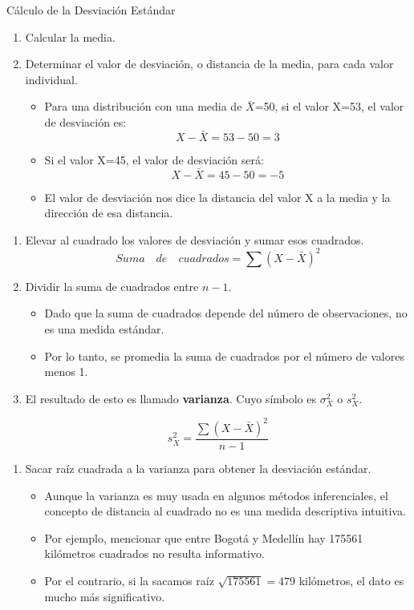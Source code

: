 \documentclass[xcolor=dvipsnames]{beamer}
\newcounter{saveenumi}
\newcommand{\seti}{\setcounter{saveenumi}{\value{enumi}}}
\newcommand{\conti}{\setcounter{enumi}{\value{saveenumi}}}
\begin{document}
\begin{frame}{Cálculo de la Desviación Estándar}
\begin{enumerate}
\justifying
\item Calcular la media.
\item Determinar el valor de desviación, o distancia de la media, para cada valor individual.
\begin{itemize}
\justifying
\item Para una distribución con una media de $\bar{X}$=50, si el valor X=53, el valor de desviación es:
$$X-\bar{X}=53-50=3$$
\item Si el valor X=45, el valor de desviación será:
$$X-\bar{X}=45-50=-5$$
\item El valor de desviación nos dice la distancia del valor X a la media y la dirección de esa distancia.
\end{itemize}
 \seti
\end{enumerate}
\end{frame}

\begin{frame}
\begin{enumerate}
\conti
\item Elevar al cuadrado los valores de desviación y sumar esos cuadrados.
$$Suma \quad de \quad cuadrados=\sum{(X-\bar{X})^2}$$
\item Dividir la suma de cuadrados entre $n-1$.
\begin{itemize}
\item Dado que la suma de cuadrados depende del número de observaciones, no es una medida estándar. 
\item Por lo tanto, se promedia la suma de cuadrados por el número de valores menos 1.
\end{itemize}
\item El resultado de esto es llamado {\bf varianza}. Cuyo símbolo es $\sigma_X^2$ o $s_X^2$.

$$s_X^2=\dfrac{\sum{(X-\bar{X})^2}}{n-1}$$
\seti
\end{enumerate}
\end{frame}

\begin{frame}
\begin{enumerate}

\item Sacar raíz cuadrada a la varianza para obtener la desviación estándar. 
\begin{itemize}
\justifying
\item Aunque la varianza es muy usada en algunos métodos inferenciales, el concepto de distancia al cuadrado no es una medida descriptiva intuitiva.
\item Por ejemplo,  mencionar que entre Bogotá y Medellín hay 175561 kilómetros cuadrados no resulta informativo.
\item Por el contrario, si la sacamos raíz $\sqrt{175561}=479$ kilómetros, el dato es mucho más significativo.
\end{itemize}
\end{enumerate}
\end{frame}
\end{document}
